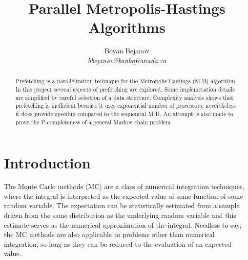 \documentclass[11pt,letterpaper]{article}       %
\begin{document}


\title{Parallel Metropolis-Hastings Algorithms}


\author{
Boyan Bejanov\\
{\em bbejanov@bankofcanada.ca}
} %

\maketitle

\begin{abstract}
Prefetching is a parallelization technique for the Metropolis-Hastings (M-H)
algorithm.  In this project several aspects of prefetching are explored.
Some implemetation details are simplified by careful selection of a
data structure. Complexity analysis shows that prefetching is 
inefficient because it uses exponential number of processors, nevertheless
it does provide speedup compared to the sequential M-H. 
An attempt is also made to prove 
the P-completeness of a general Markov chain problem.  
\end{abstract}


\section{Introduction} \label{intro}

The Monte Carlo methods (MC) are a class of numerical integration techniques,
where the integral is interpreted as the expected value of some function of
some random variable.  The expectation can be statistically estimated from a
sample drawn from the same distribution as the underlying random variable and
this estimate serves as the numerical approximation of the integral.  Needless
to say, the MC methods are also applicable to problems other than numerical
integration, so long as they can be reduced to the evaluation of an expected
value.  
\end{document}
